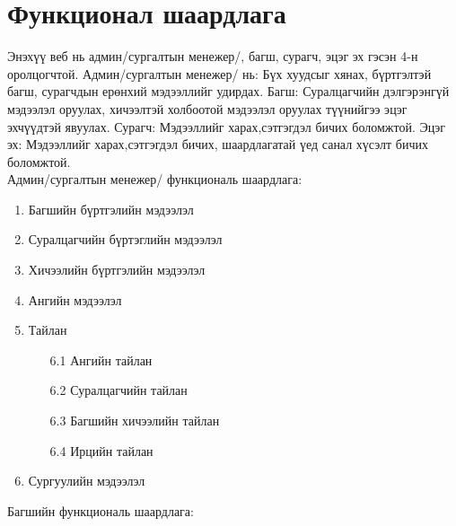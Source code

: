 \section{Функционал шаардлага}
 Энэхүү веб нь админ/сургалтын менежер/, багш, сурагч, эцэг эх гэсэн 4-н оролцогчтой.
Админ/сургалтын менежер/ нь: Бүх хуудсыг хянах, бүртгэлтэй багш, сурагчдын ерөнхий мэдээллийг удирдах.
Багш: Суралцагчийн дэлгэрэнгүй мэдээлэл оруулах, хичээлтэй холбоотой мэдээлэл оруулах түүнийгээ эцэг эхчүүдтэй явуулах.
Сурагч: Мэдээллийг харах,сэтгэгдэл бичих боломжтой.
Эцэг эх: Мэдээллийг харах,сэтгэгдэл бичих, шаардлагатай үед санал хүсэлт бичих боломжтой.\\
Админ/сургалтын менежер/ функциональ шаардлага:
\begin{enumerate}
	\item Багшийн бүртгэлийн мэдээлэл
	\item Суралцагчийн бүртэглийн мэдээлэл
	\item Хичээлийн бүртгэлийн мэдээлэл
	\item Ангийн мэдээлэл
	\item Тайлан
	\begin{enumerate}
		\item[6.1] Ангийн тайлан
		\item[6.2] Суралцагчийн тайлан
		\item[6.3] Багшийн хичээлийн тайлан
		\item[6.4] Ирцийн тайлан
	\end{enumerate}
	\item Сургуулийн мэдээлэл
\end{enumerate}
Багшийн функциональ шаардлага:
